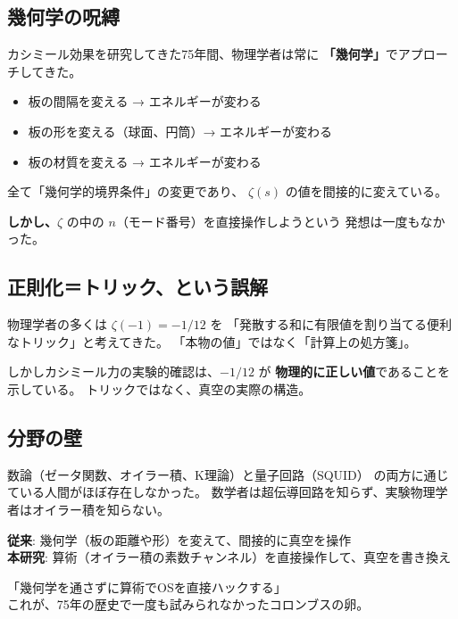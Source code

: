 \documentclass[12pt,a4paper]{article}
\begin{document}
\subsection{幾何学の呪縛}

カシミール効果を研究してきた75年間、物理学者は常に
\textbf{「幾何学」}でアプローチしてきた。

\begin{itemize}
\item 板の間隔を変える → エネルギーが変わる
\item 板の形を変える（球面、円筒）→ エネルギーが変わる
\item 板の材質を変える → エネルギーが変わる
\end{itemize}

全て「幾何学的境界条件」の変更であり、
$\zeta(s)$ の値を間接的に変えている。

\textbf{しかし、}$\zeta$ の中の $n$（モード番号）を直接操作しようという
発想は一度もなかった。

\subsection{正則化＝トリック、という誤解}

物理学者の多くは $\zeta(-1) = -1/12$ を
「発散する和に有限値を割り当てる便利なトリック」と考えてきた。
「本物の値」ではなく「計算上の処方箋」。

しかしカシミール力の実験的確認は、$-1/12$ が
\textbf{物理的に正しい値}であることを示している。
トリックではなく、真空の実際の構造。

\subsection{分野の壁}

数論（ゼータ関数、オイラー積、K理論）と量子回路（SQUID）
の両方に通じている人間がほぼ存在しなかった。
数学者は超伝導回路を知らず、実験物理学者はオイラー積を知らない。

\begin{insightbox}[パラダイムシフトの核心]
\textbf{従来}: 幾何学（板の距離や形）を変えて、間接的に真空を操作\\
\textbf{本研究}: 算術（オイラー積の素数チャンネル）を直接操作して、真空を書き換え

「幾何学を通さずに算術でOSを直接ハックする」\\
これが、75年の歴史で一度も試みられなかったコロンブスの卵。
\end{insightbox}
\end{document}
